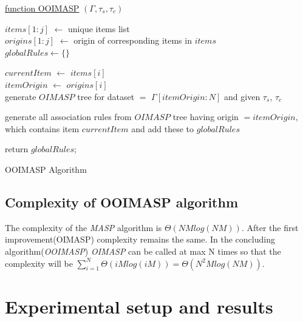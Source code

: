 \documentclass[preprint]{elsarticle}
\begin{document}
\begin{algorithm}

    \underline{function OOIMASP} $ (\Gamma, \tau _{s}, \tau _{c}) $\;
       
    $ items[1:j] $ $ \leftarrow $ unique items list \\
    $ origins[1:j] $ $ \leftarrow $ origin of corresponding items in $ items $ \\       
    $ globalRules \leftarrow \lbrace \rbrace $
       
	  {
		$ currentItem $ $ \leftarrow $ $ items[i] $ \\
		$ itemOrigin $ $ \leftarrow $ $ origins[i] $ \\
			  	
      	  {
            generate $ OIMASP $ tree for dataset $ = $ $ \Gamma[itemOrigin:N] $ and given $ \tau _{s} $, $ 				\tau _{c} $
          }	
          
		generate all association rules from $ OIMASP $ tree having origin $ = itemOrigin $, which contains 			item $ currentItem $ and add these to $ globalRules $
	  }
	          		
	return $ globalRules $;      
    \caption{OOIMASP Algorithm}
\end{algorithm}

\subsection{Complexity of OOIMASP algorithm}
The complexity of the \emph{MASP} algorithm \cite{oldmasp} is $ \Theta(NMlog(NM)) $. After the first improvement(OIMASP) complexity remains the same. In the concluding algorithm(\emph{OOIMASP}) \emph{OIMASP} can be called at max N times so that the complexity will be $ \displaystyle\sum_{i=1}^{N} \Theta(iMlog(iM)) = \Theta(N^{2}Mlog(NM)) $.

\section{Experimental setup and results}
\end{document}
